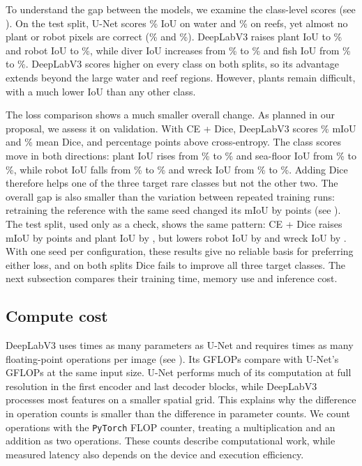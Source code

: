 To understand the gap between the models, we examine the class-level scores
(see ). On the test split, U-Net scores
\unetTestIouBW\% IoU on water and \unetTestIouRI\% on reefs, yet almost no
plant or robot pixels are correct (\unetTestIouPF\% and \unetTestIouRO\%).
DeepLabV3 raises plant IoU to \deeplabCeTestIouPF\% and robot IoU to
\deeplabCeTestIouRO\%, while diver IoU increases from \unetTestIouHD\% to
\deeplabCeTestIouHD\% and fish IoU from \unetTestIouFV\% to
\deeplabCeTestIouFV\%. DeepLabV3 scores higher on every class on both splits,
so its advantage extends beyond the large water and reef regions. However,
plants remain difficult, with a much lower IoU than any other class.



The loss comparison shows a much smaller overall change. As planned in our
proposal, we assess it on validation. With CE + Dice,
DeepLabV3 scores \deeplabDiceValMiou\% mIoU and \deeplabDiceValDice\% mean Dice,
\diceDeltaMiou{} and \diceDeltaDice{} percentage points above cross-entropy. The
class scores move in both directions: plant IoU rises from \deeplabCeIouPF\% to
\deeplabDiceIouPF\% and sea-floor IoU from \deeplabCeIouSR\% to
\deeplabDiceIouSR\%, while robot IoU falls from \deeplabCeIouRO\% to
\deeplabDiceIouRO\% and wreck IoU from \deeplabCeIouWR\% to \deeplabDiceIouWR\%.
Adding Dice therefore helps one of the three target rare classes but not the
other two. The overall gap is also smaller than the variation between repeated
training runs: retraining the reference with the same seed changed its mIoU by
\repeatReferenceGap{} points (see ). The test split, used
only as a check, shows the same pattern: CE + Dice raises mIoU by
\diceTestDeltaMiou{} points and plant IoU by \diceTestDeltaPF{}, but lowers
robot IoU by \diceTestDeltaRO{} and wreck IoU by \diceTestDeltaWR{}. With one
seed per configuration, these results give no reliable basis for preferring
either loss, and on both splits Dice fails to improve all three target classes.
The next subsection compares their training time, memory use and inference
cost.

\subsection{Compute cost}
\label{sec:compute}
DeepLabV3 uses \parameterRatio{} times as many parameters as U-Net and
requires \flopRatio{} times as many floating-point operations per image
(see ). Its \deeplabGflops{} GFLOPs compare with
U-Net's \unetGflops{} GFLOPs at the same input size. U-Net performs much of its
computation at full resolution in the first encoder and last decoder blocks,
while DeepLabV3 processes most features on a smaller spatial grid. This explains
why the difference in operation counts is smaller than the difference in
parameter counts. We count operations with the \texttt{PyTorch} FLOP counter,
treating a multiplication and an addition as two operations. These counts
describe computational work, while measured latency also depends on the device
and execution efficiency.

